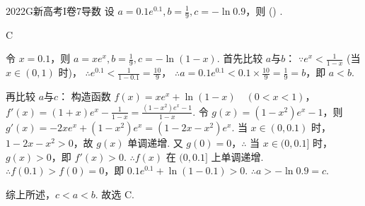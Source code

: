 
\begin{problem}{2022}{G}{新高考I卷}{7}{导数}
设 $a=0.1e^{0.1}, b=\frac{1}{9}, c=-\ln 0.9$，则 (\hspace{1cm}) .
\begin{choices}
\end{choices}
\end{problem}

\begin{answer}
C
\end{answer}

\begin{solutions}
令 $x=0.1$，则 $a=xe^x, b=\frac{1}{9}, c=-\ln(1-x)$.
首先比较 $a$与$b$：
$\because e^x < \frac{1}{1-x}$ (当 $x \in (0,1)$ 时)，
$\therefore e^{0.1} < \frac{1}{1-0.1} = \frac{10}{9}$，
$\therefore a = 0.1e^{0.1} < 0.1 \times \frac{10}{9} = \frac{1}{9} = b$，即 $a < b$.

再比较 $a$与$c$：
构造函数 $f(x) = xe^x + \ln(1-x) \quad (0 < x < 1)$，
$f'(x) = (1+x)e^x - \frac{1}{1-x} = \frac{(1-x^2)e^x - 1}{1-x}$.
令 $g(x) = (1-x^2)e^x - 1$，则 $g'(x) = -2xe^x + (1-x^2)e^x = (1-2x-x^2)e^x$.
当 $x \in (0, 0.1)$ 时，$1-2x-x^2 > 0$，故 $g(x)$ 单调递增.
又 $g(0) = 0$，$\therefore$ 当 $x \in (0, 0.1]$ 时，$g(x) > 0$，即 $f'(x) > 0$.
$\therefore f(x)$ 在 $(0, 0.1]$ 上单调递增.
$\therefore f(0.1) > f(0) = 0$，即 $0.1e^{0.1} + \ln(1-0.1) > 0$.
$\therefore a > -\ln 0.9 = c$.

综上所述，$c < a < b$.
故选 C.
\end{solutions}